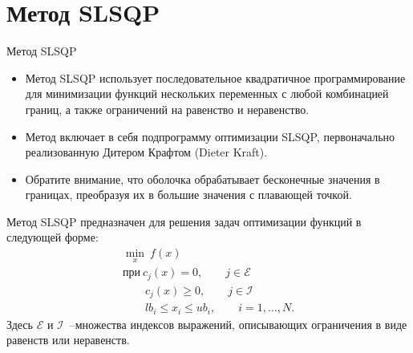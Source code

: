 \documentclass[aspectratio=169, mathserif]{beamer}%
\begin{document}
\section{Метод SLSQP}
\begin{frame}[fragile, label=c]{Метод SLSQP}
\scriptsize
\begin{itemize}
\item Метод SLSQP использует последовательное квадратичное программирование для минимизации функций нескольких переменных с любой комбинацией границ, а также ограничений на равенство и неравенство.
\item Метод включает в себя подпрограмму оптимизации SLSQP, первоначально реализованную Дитером Крафтом (Dieter Kraft).
\item Обратите внимание, что оболочка обрабатывает бесконечные значения в границах, преобразуя их в большие значения с плавающей точкой.
\end{itemize}
\vfill
Метод SLSQP предназначен для решения задач оптимизации функций в следующей форме:
\vfill
\begin{equation}\label{eq:problem}
\begin{gathered}
\underset{x}{\min}\ f\left(x\right) \\
\mathrm{при }\ c_j\left(x\right) = 0, \qquad j \in \mathcal{E} \\
\qquad c_j\left(x\right) \geqslant 0, \qquad j \in \mathcal{I} \\
\qquad lb_i \leqslant x_i \leqslant ub_i, \qquad i = 1, \ldots , N.
\end{gathered}
\end{equation}
\vfill
Здесь $\mathcal{E}$ и $\mathcal{I}$~--множества индексов выражений, описывающих ограничения в виде равенств или неравенств.
\vfill
\end{frame}
\end{document}
